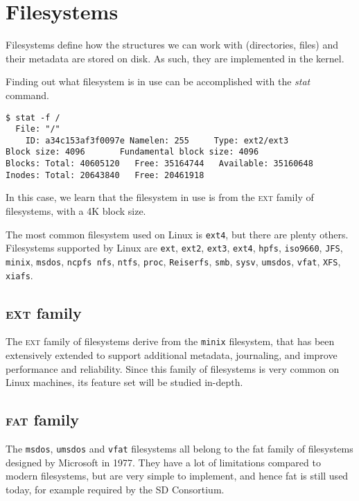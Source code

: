 \documentclass[a4paper]{article}
\begin{document}
\section{Filesystems}

Filesystems define how the structures we can work with (directories, files) and their metadata are stored on disk. As such, they are implemented in the kernel. 

Finding out what filesystem is in use can be accomplished with the \emph{stat} command.

\begin{verbatim}
$ stat -f /
  File: "/"
    ID: a34c153af3f0097e Namelen: 255     Type: ext2/ext3
Block size: 4096       Fundamental block size: 4096
Blocks: Total: 40605120   Free: 35164744   Available: 35160648
Inodes: Total: 20643840   Free: 20461918
\end{verbatim}

In this case, we learn that the filesystem in use is from the \textsc{ext} family of filesystems, with a 4K block size.

The most common filesystem used on Linux is \verb|ext4|, but there are plenty others. Filesystems supported by Linux are \verb|ext|, \verb|ext2|, \verb|ext3|, \verb|ext4|, \verb|hpfs|, \verb|iso9660|, \verb|JFS|, \verb|minix|, \verb|msdos|, \verb|ncpfs nfs|, \verb|ntfs|, \verb|proc|, \verb|Reiserfs|, \verb|smb|, \verb|sysv|, \verb|umsdos|, \verb|vfat|, \verb|XFS|, \verb|xiafs|.

\subsection{\textsc{ext} family}

The \textsc{ext} family of filesystems derive from the \verb|minix| filesystem, that has been extensively extended to support additional metadata, journaling, and improve performance and reliability. Since this family of filesystems is very common on Linux machines, its feature set will be studied in-depth.

\subsection{\textsc{fat} family}

The \verb|msdos|, \verb|umsdos| and \verb|vfat| filesystems all belong to the \gls{fat} family of filesystems designed by Microsoft in 1977. They have a lot of limitations compared to modern filesystems, but are very simple to implement, and hence \gls{fat} is still used today, for example required by the SD Consortium.
\end{document}
